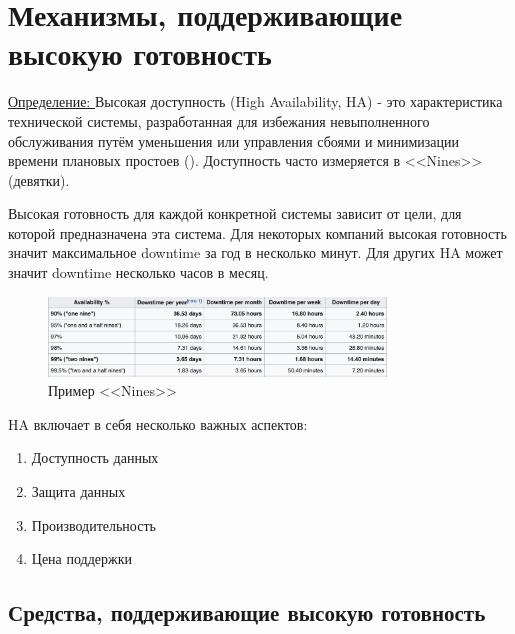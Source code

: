 \section{Механизмы, поддерживающие высокую готовность}

\underline{Определение: } Высокая доступность (High Availability, HA) - это характеристика технической системы, разработанная для избежания невыполненного обслуживания путём уменьшения или управления сбоями и минимизации времени плановых простоев (\autocite{WikiHA}). Доступность часто измеряется в <<Nines>> (девятки).

Высокая готовность для каждой конкретной системы зависит от цели, для которой предназначена эта система. Для некоторых компаний высокая готовность значит максимальное downtime за год в несколько минут. Для других HA может значит downtime несколько часов в месяц.
\begin{figure}[h]
    \centering
    \includegraphics[width=0.8\textwidth]{assets/avail.png}
    \caption{Пример <<Nines>>}
    \label{fig:mesh1}
\end{figure}

HA включает в себя несколько важных аспектов:
\begin{enumerate}
    \item Доступность данных
    \item Защита данных
    \item Производительность
    \item Цена поддержки
\end{enumerate}

\subsection{Средства, поддерживающие высокую готовность}
